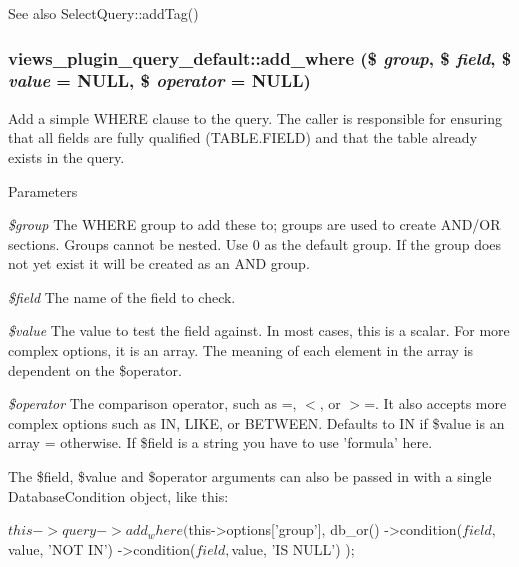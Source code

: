 \begin{DoxySeeAlso}{See also}
SelectQuery::addTag() 
\end{DoxySeeAlso}
\hypertarget{classviews__plugin__query__default_a5a70ca8325494614f66096a38b8625d7}{
\subsubsection[{add\_\-where}]{\setlength{\rightskip}{0pt plus 5cm}views\_\-plugin\_\-query\_\-default::add\_\-where (\$ {\em group}, \/  \$ {\em field}, \/  \$ {\em value} = {\ttfamily NULL}, \/  \$ {\em operator} = {\ttfamily NULL})}}
\label{classviews__plugin__query__default_a5a70ca8325494614f66096a38b8625d7}
Add a simple WHERE clause to the query. The caller is responsible for ensuring that all fields are fully qualified (TABLE.FIELD) and that the table already exists in the query.


\begin{DoxyParams}{Parameters}
\item[{\em \$group}]The WHERE group to add these to; groups are used to create AND/OR sections. Groups cannot be nested. Use 0 as the default group. If the group does not yet exist it will be created as an AND group. \item[{\em \$field}]The name of the field to check. \item[{\em \$value}]The value to test the field against. In most cases, this is a scalar. For more complex options, it is an array. The meaning of each element in the array is dependent on the \$operator. \item[{\em \$operator}]The comparison operator, such as =, $<$, or $>$=. It also accepts more complex options such as IN, LIKE, or BETWEEN. Defaults to IN if \$value is an array = otherwise. If \$field is a string you have to use 'formula' here.\end{DoxyParams}
The \$field, \$value and \$operator arguments can also be passed in with a single DatabaseCondition object, like this: 
\begin{DoxyCode}
   $this->query->add_where(
     $this->options['group'],
     db_or()
       ->condition($field, $value, 'NOT IN')
       ->condition($field, $value, 'IS NULL')
   );
\end{DoxyCode}


